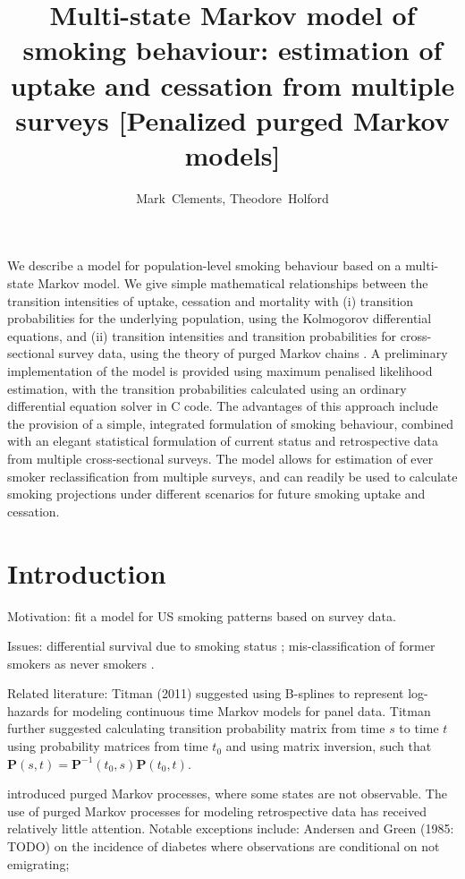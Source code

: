 \documentclass[11pt,a4paper]{article}
\title{Multi-state Markov model of smoking behaviour: estimation of
  uptake and cessation from multiple surveys [Penalized purged Markov models]}
\author{Mark~Clements, Theodore~Holford}
\begin{document}
\maketitle

\abstract We describe a model for population-level smoking behaviour
based on a multi-state Markov model. We give simple mathematical
relationships between the transition intensities of uptake, cessation
and mortality with (i) transition probabilities for the underlying
population, using the Kolmogorov differential equations, and (ii)
transition intensities and transition probabilities for
cross-sectional survey data, using the theory of purged Markov chains
\citep{hoem_purged_1969}. A preliminary implementation of the model
is provided using maximum penalised likelihood estimation, with the
transition probabilities calculated using an ordinary differential
equation solver in C code. The advantages of this approach include the
provision of a simple, integrated formulation of smoking behaviour,
combined with an elegant statistical formulation of current status and
retrospective data from multiple cross-sectional surveys. The model
allows for estimation of ever smoker reclassification from multiple
surveys, and can readily be used to calculate smoking projections
under different scenarios for future smoking uptake and cessation. 


\section{Introduction}

Motivation: fit a model for US smoking patterns based on survey data. 

Issues: differential survival due to smoking status \citep{harris_cigarette_1983}; mis-classification of former smokers as never smokers \citep{van_de_mheen_reported_1994}.

Related literature: Titman (2011) suggested using B-splines to represent log-hazards for modeling continuous time Markov models for panel data. Titman further suggested calculating transition probability matrix from time $s$ to time $t$ using probability matrices from time $t_0$ and using matrix inversion, such that $\bm{P}(s,t)=\bm{P}^{-1}(t_0,s)\bm{P}(t_0,t)$.

\citet{hoem_purged_1969} introduced purged Markov processes, where some states are not observable. The use of purged Markov processes for modeling retrospective data has received relatively little attention. Notable exceptions include: Andersen and Green (1985: TODO) on the incidence of diabetes where observations are conditional on not emigrating; 
\end{document}
